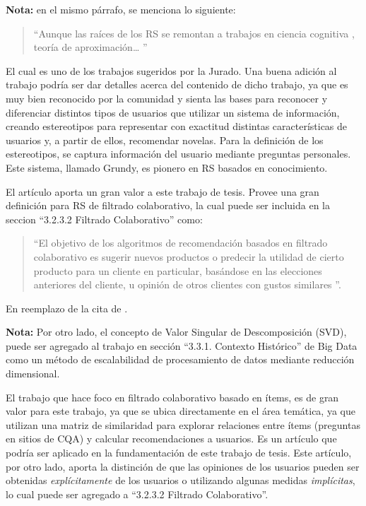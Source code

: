 \noindent \textbf{Nota: }en el mismo párrafo, se menciona lo siguiente:
\begin{quotation}
	“Aunque las raíces de los RS se remontan a trabajos en ciencia cognitiva \citep{rich1979user}, teoría de aproximación… ”
\end{quotation}

El cual es uno de los trabajos sugeridos por la Jurado. Una buena adición al trabajo podría ser dar detalles acerca del contenido de dicho trabajo, ya que es muy bien reconocido por la comunidad y sienta las bases para reconocer y diferenciar distintos tipos de usuarios que utilizar un sistema de información, creando estereotipos para representar con exactitud distintas características de usuarios y, a partir de ellos, recomendar novelas. Para la definición de los estereotipos, se captura información del usuario mediante preguntas personales. Este sistema, llamado Grundy, es pionero en RS basados en conocimiento.

\bigskip

El artículo \citep{sarwar2002incremental} aporta un gran valor a este trabajo de tesis. Provee una gran definición para RS de filtrado colaborativo, la cual puede ser incluida en la seccion “3.2.3.2 Filtrado Colaborativo” como:
\begin{quotation}
“El objetivo de los algoritmos de recomendación basados en filtrado colaborativo es sugerir nuevos productos o predecir la utilidad de cierto producto para un cliente en particular, basándose en las elecciones anteriores del cliente, u opinión de otros clientes con gustos similares \citep{sarwar2002incremental}”.
\end{quotation}
\noindent En reemplazo de la cita de \citep{schafer2007collaborative}.

\bigskip
\textbf{Nota:} Por otro lado, el concepto de Valor Singular de Descomposición (SVD), puede ser agregado al trabajo en sección “3.3.1. Contexto Histórico” de Big Data como un método de escalabilidad de procesamiento de datos mediante reducción dimensional.

\bigskip

El trabajo \citep{sarwar2001item} que hace foco en filtrado colaborativo basado en ítems, es de gran valor para este trabajo, ya que se ubica directamente en el área temática, ya que utilizan una matriz de similaridad para explorar relaciones entre ítems (preguntas en sitios de CQA) y calcular recomendaciones a usuarios. Es un artículo que podría ser aplicado en la fundamentación de este trabajo de tesis. Este artículo, por otro lado, aporta la distinción de que las opiniones de los usuarios pueden ser obtenidas \textit{explícitamente} de los usuarios o utilizando algunas medidas \textit{implícitas}, lo cual puede ser agregado a “3.2.3.2 Filtrado Colaborativo”.

